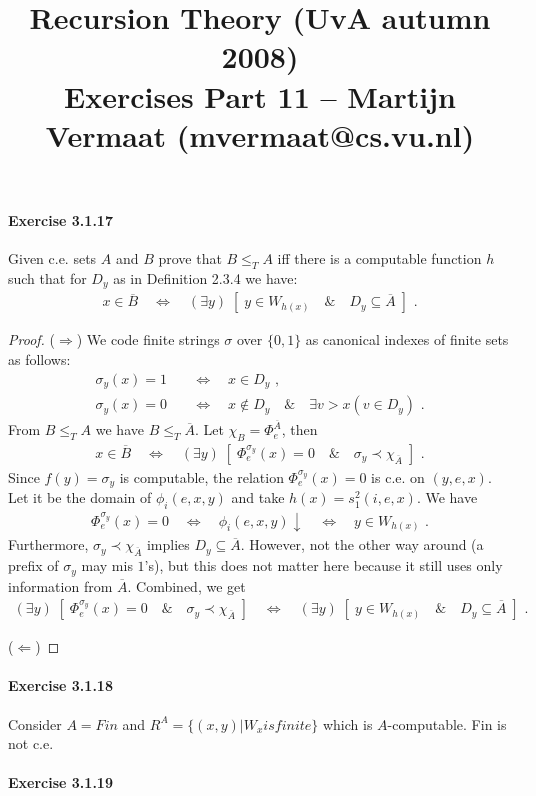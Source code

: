\documentclass[a4paper,11pt]{article}
\title{Recursion Theory (UvA autumn 2008)\\
\normalsize{Exercises Part 11 -- Martijn Vermaat (mvermaat@cs.vu.nl)}}
\date{}
\begin{document}
\maketitle


\paragraph{Exercise 3.1.17}

Given c.e. sets $A$ and $B$ prove that $B \leq_T A$ iff there is a computable
function $h$ such that for $D_y$ as in Definition 2.3.4 we have:
\begin{align*}
  x \in \overline{B} \quad \Longleftrightarrow \quad (\exists y) \; [ \; y \in W_{h(x)} \quad \& \quad D_y \subseteq \overline{A} \; ] \text{ .}
\end{align*}

\begin{proof}
($\Rightarrow$)
We code finite strings $\sigma$ over $\{0, 1\}$ as canonical indexes of
finite sets as follows:
\begin{align*}
  \sigma_y(x) = 1 \quad & \Longleftrightarrow \quad x \in D_y \text{ ,} \\
  \sigma_y(x) = 0 \quad & \Longleftrightarrow \quad x \notin D_y \quad \& \quad \exists v \! > \! x (v \in D_y) \text{ .}
\end{align*}
From $B \leq_T A$ we have $B \leq_T \overline{A}$.
Let $\chi_B = \Phi^{\overline{A}}_e$, then
\begin{align*}
  x \in \overline{B} \quad \Longleftrightarrow \quad (\exists y) \; [ \; \Phi^{\sigma_y}_e(x) = 0 \quad \& \quad \sigma_y \prec \chi_{\overline{A}} \; ] \text{ .}
\end{align*}
Since $f(y) = \sigma_y$ is computable, the relation $\Phi^{\sigma_y}_e(x) = 0$ is c.e. on $(y, e, x)$.
Let it be the domain of $\phi_i(e, x, y)$ and take $h(x) = s^2_1(i, e, x)$. We have
\begin{align*}
  \Phi^{\sigma_y}_e(x) = 0 \quad \Longleftrightarrow \quad \phi_i(e, x, y) \! \downarrow \quad \Longleftrightarrow \quad y \in W_{h(x)} \text{ .}
\end{align*}
Furthermore, $\sigma_y \prec \chi_{\overline{A}}$ implies $D_y \subseteq \overline{A}$.
However, not the other way around (a prefix of $\sigma_y$ may mis $1$'s), but this does not
matter here because it still uses only information from $\overline{A}$. Combined, we get
\begin{align*}
  (\exists y) \; [ \; \Phi^{\sigma_y}_e(x) = 0 \quad \& \quad \sigma_y \prec \chi_{\overline{A}} \; ] \quad \Longleftrightarrow \quad (\exists y) \; [ \; y \in W_{h(x)} \quad \& \quad D_y \subseteq \overline{A} \; ] \text{ .}
\end{align*}

($\Leftarrow$)
\end{proof}


\paragraph{Exercise 3.1.18}

Consider $A = Fin$ and $R^A = \{ (x,y) | W_x is finite \}$ which is $A$-computable. Fin is not c.e.


\paragraph{Exercise 3.1.19}
\end{document}
